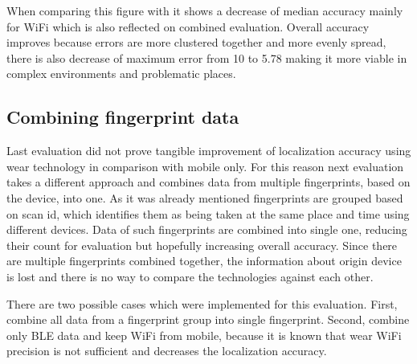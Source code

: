 When comparing this figure with  it shows a decrease of median accuracy mainly for WiFi which is also reflected on combined evaluation. Overall accuracy improves because errors are more clustered together and more evenly spread, there is also decrease of maximum error from 10 to 5.78 making it more viable in complex environments and problematic places.

\subsection{Combining fingerprint data}\label{sec:CombiningFingerprintData}
Last evaluation did not prove tangible improvement of localization accuracy using wear technology in comparison with mobile only. For this reason next evaluation takes a different approach and combines data from multiple fingerprints, based on the device, into one. As it was already mentioned fingerprints are grouped based on scan id, which identifies them as being taken at the same place and time using different devices. Data of such fingerprints are combined into single one, reducing their count for evaluation but hopefully increasing overall accuracy. Since there are multiple fingerprints combined together, the information about origin device is lost and there is no way to compare the technologies against each other.

There are two possible cases which were implemented for this evaluation. First, combine all data from a fingerprint group into single fingerprint. Second, combine only BLE data and keep WiFi from mobile, because it is known that wear WiFi precision is not sufficient and decreases the localization accuracy.

\vspace*{6pt}
\begin{table}[h]
	\begin{center}
		\caption{List of errors for fingerprint combination}
		\label{tab07c06}
	\end{center}
\end{table}
\vspace*{-\baselineskip}
\vspace*{6pt}

